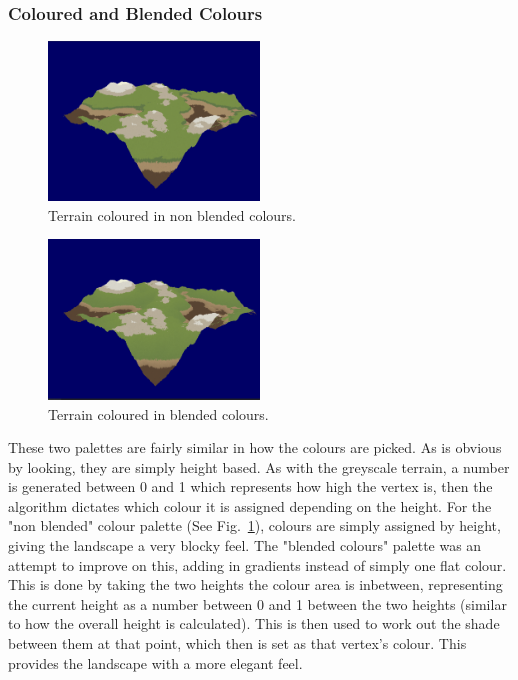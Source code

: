 \documentclass[a4paper,10pt]{report}
\begin{document}
\subsubsection{Coloured and Blended Colours}
\begin{figure}[ht!]
    \centering
  \includegraphics[width=0.5\textwidth]{Images/Screenshots/palette-c.png}
 \caption{Terrain coloured in non blended colours.}
 \label{fig:palette-c}
\end{figure}

\begin{figure}[ht!]
    \centering
  \includegraphics[width=0.5\textwidth]{Images/Screenshots/palette-b.png}
 \caption{Terrain coloured in blended colours.}
 \label{fig:palette-b}
\end{figure}

These two palettes are fairly similar in how the colours are picked. As is obvious by looking, they are simply height based. As with the greyscale terrain, a number is generated between 0 and 1 which represents how high the vertex is, then the algorithm dictates which colour it is assigned depending on the height. For the "non blended" colour palette (See Fig.~\ref{fig:palette-c}), colours are simply assigned by height, giving the landscape a very blocky feel. The "blended colours" palette was an attempt to improve on this, adding in gradients instead of simply one flat colour. This is done by taking the two heights the colour area is inbetween, representing the current height as a number between 0 and 1 between the two heights (similar to how the overall height is calculated). This is then used to work out the shade between them at that point, which then is set as that vertex's colour. This provides the landscape with a more elegant feel. 
\end{document}
